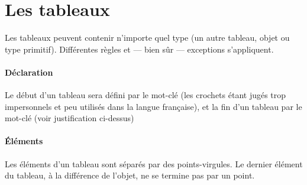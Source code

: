 \documentclass[french]{article}
\begin{document}
\section{Les tableaux} {
    Les tableaux peuvent contenir n'importe quel type (un autre tableau, objet ou type primitif). Différentes règles et  --- bien sûr --- exceptions s'appliquent.
    \paragraph{Déclaration}{
Le début d'un tableau sera défini par le mot-clé  (les crochets étant jugés trop impersonnels et peu utilisés dans la langue française), et la fin d'un tableau par le mot-clé  (voir justification ci-dessus)}
}
	\paragraph{Éléments}{
Les éléments d'un tableau sont séparés par des points-virgules. Le dernier élément du tableau, à la différence de l'objet, ne se termine pas par un point.
}
\end{document}

